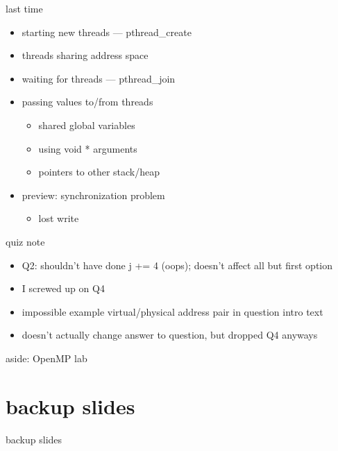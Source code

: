 \date{}
\title{}
\date{}

\begin{frame}
    \titlepage
\end{frame}



\begin{frame}{last time}
    \begin{itemize}
    \item starting new threads --- pthread\_create
    \item threads sharing address space
    \item waiting for threads --- pthread\_join
    \item passing values to/from threads
        \begin{itemize}
        \item shared global variables
        \item using void * arguments
        \item pointers to other stack/heap
        \end{itemize}
    \item preview: synchronization problem
        \begin{itemize}
        \item lost write
        \end{itemize}
    \end{itemize}
\end{frame}

\begin{frame}{quiz note}
    \begin{itemize}
    \item Q2: shouldn't have done j += 4 (oops); doesn't affect all but first option
    \vspace{.5cm}
    \item I screwed up on Q4
    \item impossible example virtual/physical address pair in question intro text
    \item doesn't actually change answer to question, but dropped Q4 anyways
    \end{itemize}
\end{frame}

\begin{frame}{aside: OpenMP lab}
\end{frame}





\section{backup slides}
\begin{frame}{backup slides}
\end{frame}


